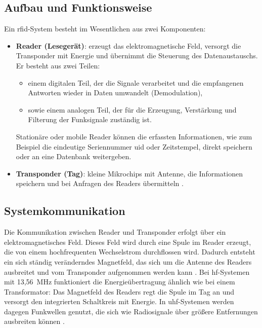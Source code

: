 \subsection{Aufbau und Funktionsweise}

Ein \ac{rfid}-System besteht im Wesentlichen aus zwei Komponenten:

\begin{itemize}
	\item \textbf{Reader (Lesegerät)}: erzeugt das elektromagnetische Feld, versorgt die Transponder mit Energie und übernimmt die Steuerung des Datenaustauschs. 
	Er besteht aus zwei Teilen: 
	\begin{itemize}
		\item einem digitalen Teil, der die Signale verarbeitet und die empfangenen Antworten wieder in Daten umwandelt (Demodulation),
		\item sowie einem analogen Teil, der für die Erzeugung, Verstärkung und Filterung der Funksignale zuständig ist. 
	\end{itemize}
	Stationäre oder mobile Reader können die erfassten Informationen, wie zum Beispiel die eindeutige Seriennummer \ac{uid} oder Zeitstempel, direkt speichern oder an eine Datenbank weitergeben. 
	\item \textbf{Transponder (Tag)}: kleine Mikrochips mit Antenne, die Informationen speichern und bei Anfragen des Readers übermitteln \cite{Heuermann:2023}. 
\end{itemize}



\subsection{Systemkommunikation}

Die Kommunikation zwischen Reader und Transponder erfolgt über ein elektromagnetisches Feld. 
Dieses Feld wird durch eine Spule im Reader erzeugt, die von einem hochfrequenten Wechselstrom durchflossen wird. 
Dadurch entsteht ein sich ständig veränderndes Magnetfeld, das sich um die Antenne des Readers ausbreitet und vom Transponder aufgenommen werden kann \cite{Conrad:2024a}. 
Bei \ac{hf}-Systemen mit 13{,}56~MHz funktioniert die Energieübertragung ähnlich wie bei einem Transformator: 
Das Magnetfeld des Readers regt die Spule im Tag an und versorgt den integrierten Schaltkreis mit Energie. 
In \ac{uhf}-Systemen werden dagegen Funkwellen genutzt, die sich wie Radiosignale über größere Entfernungen ausbreiten können \cite{Rieback:2006}.  

